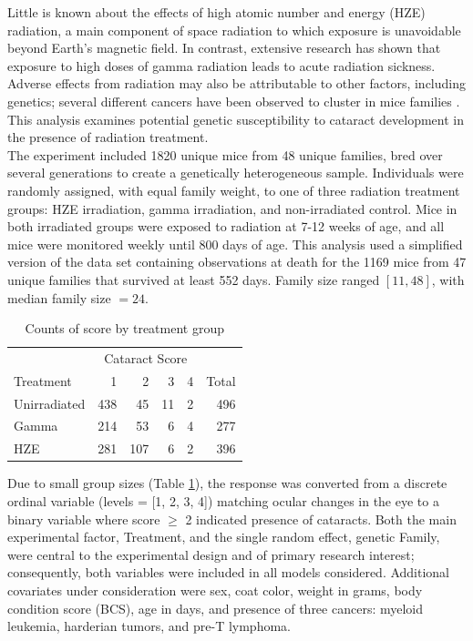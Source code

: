 \documentclass[12pt]{article}
\begin{document}
Little is known about the effects of high atomic number and energy (HZE) radiation, a main component of space radiation to which exposure is unavoidable beyond Earth's magnetic field. In contrast, extensive research has shown that exposure to high doses of gamma radiation leads to acute radiation sickness. Adverse effects from radiation may also be attributable to other factors, including genetics; several different cancers have been observed to cluster in mice families \citep{mice2017}. This analysis examines potential genetic susceptibility to cataract development in the presence of radiation treatment.\\
The experiment included 1820 unique mice from 48 unique families, bred over several generations to create a genetically heterogeneous sample. Individuals were randomly assigned, with equal family weight, to one of three radiation treatment groups: HZE irradiation, gamma irradiation, and non-irradiated control. Mice in both irradiated groups were exposed to radiation at 7-12 weeks of age, and all mice were monitored weekly until 800 days of age. This analysis used a simplified version of the data set containing observations at death for the 1169 mice from 47 unique families that survived at least 552 days. Family size ranged \([11, 48]\), with median family size \(= 24\).\\

\begin{table}
\centering
\begin{tabular}{lrrrrr}
  \toprule
\multicolumn{1}{c}{ } & \multicolumn{4}{c}{Cataract Score} & \multicolumn{1}{c}{ } \\
\cmidrule(l{3pt}r{3pt}){2-5}
Treatment & 1 & 2 & 3 & 4 & Total \\ 
  \midrule
Unirradiated & 438 &  45 &  11 &   2 & 496 \\ 
  Gamma & 214 &  53 &   6 &   4 & 277 \\ 
  HZE & 281 & 107 &   6 &   2 & 396 \\ 
   \bottomrule
\end{tabular}
\caption{Counts of score by treatment group} 
\label{tab:gtab}
\end{table}

Due to small group sizes (Table \ref{tab:gtab}), the response was converted from a discrete ordinal variable (levels = {[}1, 2, 3, 4{]}) matching ocular changes in the eye to a binary variable where score \(\ge\) 2 indicated presence of cataracts. Both the main experimental factor, Treatment, and the single random effect, genetic Family, were central to the experimental design and of primary research interest; consequently, both variables were included in all models considered. Additional covariates under consideration were sex, coat color, weight in grams, body condition score (BCS), age in days, and presence of three cancers: myeloid leukemia, harderian tumors, and pre-T lymphoma.
\end{document}
